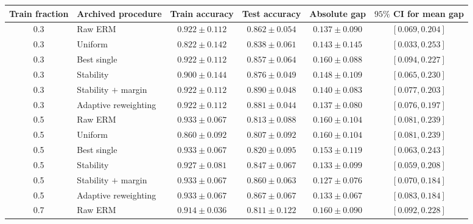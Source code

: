 \begin{table}[p]
\centering
\scriptsize
\setlength{\tabcolsep}{4pt}
\renewcommand{\arraystretch}{0.96}
\begin{tabular}{clcccc}
\toprule
Train fraction & Archived procedure & Train accuracy & Test accuracy & Absolute gap & \(95\%\) CI for mean gap \\
\midrule
0.3 & Raw ERM & \(0.922\mathbin{\pm}0.112\) & \(0.862\mathbin{\pm}0.054\) & \(0.137\mathbin{\pm}0.090\) & \([0.069,0.204]\) \\
0.3 & Uniform & \(0.822\mathbin{\pm}0.142\) & \(0.838\mathbin{\pm}0.061\) & \(0.143\mathbin{\pm}0.145\) & \([0.033,0.253]\) \\
0.3 & Best single & \(0.922\mathbin{\pm}0.112\) & \(0.857\mathbin{\pm}0.064\) & \(0.160\mathbin{\pm}0.088\) & \([0.094,0.227]\) \\
0.3 & Stability & \(0.900\mathbin{\pm}0.144\) & \(0.876\mathbin{\pm}0.049\) & \(0.148\mathbin{\pm}0.109\) & \([0.065,0.230]\) \\
0.3 & Stability \(+\) margin & \(0.922\mathbin{\pm}0.112\) & \(0.890\mathbin{\pm}0.048\) & \(0.140\mathbin{\pm}0.083\) & \([0.077,0.203]\) \\
0.3 & Adaptive reweighting & \(0.922\mathbin{\pm}0.112\) & \(0.881\mathbin{\pm}0.044\) & \(0.137\mathbin{\pm}0.080\) & \([0.076,0.197]\) \\
\midrule
0.5 & Raw ERM & \(0.933\mathbin{\pm}0.067\) & \(0.813\mathbin{\pm}0.088\) & \(0.160\mathbin{\pm}0.104\) & \([0.081,0.239]\) \\
0.5 & Uniform & \(0.860\mathbin{\pm}0.092\) & \(0.807\mathbin{\pm}0.092\) & \(0.160\mathbin{\pm}0.104\) & \([0.081,0.239]\) \\
0.5 & Best single & \(0.933\mathbin{\pm}0.067\) & \(0.820\mathbin{\pm}0.095\) & \(0.153\mathbin{\pm}0.119\) & \([0.063,0.243]\) \\
0.5 & Stability & \(0.927\mathbin{\pm}0.081\) & \(0.847\mathbin{\pm}0.067\) & \(0.133\mathbin{\pm}0.099\) & \([0.059,0.208]\) \\
0.5 & Stability \(+\) margin & \(0.933\mathbin{\pm}0.067\) & \(0.860\mathbin{\pm}0.063\) & \(0.127\mathbin{\pm}0.076\) & \([0.070,0.184]\) \\
0.5 & Adaptive reweighting & \(0.933\mathbin{\pm}0.067\) & \(0.867\mathbin{\pm}0.067\) & \(0.133\mathbin{\pm}0.067\) & \([0.083,0.184]\) \\
\midrule
0.7 & Raw ERM & \(0.914\mathbin{\pm}0.036\) & \(0.811\mathbin{\pm}0.122\) & \(0.160\mathbin{\pm}0.090\) & \([0.092,0.228]\) \\

\end{tabular}
\end{table}
